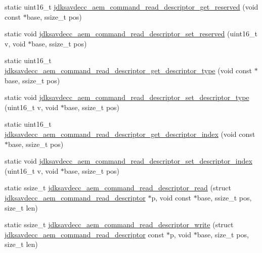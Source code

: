 \begin{DoxyCompactItemize}
\item 
static uint16\+\_\+t \hyperlink{group__command__read__descriptor_gad089600c29b50bb476ad567af318e89c}{jdksavdecc\+\_\+aem\+\_\+command\+\_\+read\+\_\+descriptor\+\_\+get\+\_\+reserved} (void const $\ast$base, ssize\+\_\+t pos)
\item 
static void \hyperlink{group__command__read__descriptor_ga01b98e38f99987e2baea245e27611a51}{jdksavdecc\+\_\+aem\+\_\+command\+\_\+read\+\_\+descriptor\+\_\+set\+\_\+reserved} (uint16\+\_\+t v, void $\ast$base, ssize\+\_\+t pos)
\item 
static uint16\+\_\+t \hyperlink{group__command__read__descriptor_gaa141e1ed9bc9fd0176ab593146aa6ef2}{jdksavdecc\+\_\+aem\+\_\+command\+\_\+read\+\_\+descriptor\+\_\+get\+\_\+descriptor\+\_\+type} (void const $\ast$base, ssize\+\_\+t pos)
\item 
static void \hyperlink{group__command__read__descriptor_ga519406e2fdb65c3bb2076f110806a3ab}{jdksavdecc\+\_\+aem\+\_\+command\+\_\+read\+\_\+descriptor\+\_\+set\+\_\+descriptor\+\_\+type} (uint16\+\_\+t v, void $\ast$base, ssize\+\_\+t pos)
\item 
static uint16\+\_\+t \hyperlink{group__command__read__descriptor_gabfc491b799a6904e6c80e95c62755e0b}{jdksavdecc\+\_\+aem\+\_\+command\+\_\+read\+\_\+descriptor\+\_\+get\+\_\+descriptor\+\_\+index} (void const $\ast$base, ssize\+\_\+t pos)
\item 
static void \hyperlink{group__command__read__descriptor_gaeffa402cc93d129509eb65958b6cb55e}{jdksavdecc\+\_\+aem\+\_\+command\+\_\+read\+\_\+descriptor\+\_\+set\+\_\+descriptor\+\_\+index} (uint16\+\_\+t v, void $\ast$base, ssize\+\_\+t pos)
\item 
static ssize\+\_\+t \hyperlink{group__command__read__descriptor_gaf2267d51eeda140006c929bfad348bf7}{jdksavdecc\+\_\+aem\+\_\+command\+\_\+read\+\_\+descriptor\+\_\+read} (struct \hyperlink{structjdksavdecc__aem__command__read__descriptor}{jdksavdecc\+\_\+aem\+\_\+command\+\_\+read\+\_\+descriptor} $\ast$p, void const $\ast$base, ssize\+\_\+t pos, size\+\_\+t len)
\item 
static ssize\+\_\+t \hyperlink{group__command__read__descriptor_gade3ca50a535aaef541561a6ea62d2ca0}{jdksavdecc\+\_\+aem\+\_\+command\+\_\+read\+\_\+descriptor\+\_\+write} (struct \hyperlink{structjdksavdecc__aem__command__read__descriptor}{jdksavdecc\+\_\+aem\+\_\+command\+\_\+read\+\_\+descriptor} const $\ast$p, void $\ast$base, size\+\_\+t pos, size\+\_\+t len)
\end{DoxyCompactItemize}


